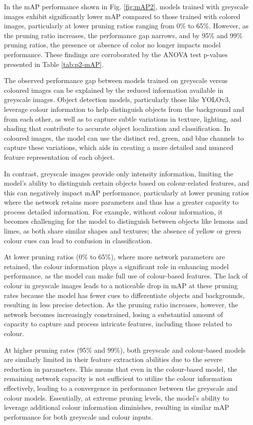 \documentclass[journal,onecolumn,12pt]{IEEEtran}
\begin{document}
In the mAP performance shown in Fig. \ref{fig:mAP2}, models trained with greyscale images exhibit significantly lower mAP compared to those trained with colored images, particularly at lower pruning ratios ranging from 0\% to 65\%. However, as the pruning ratio increases, the performance gap narrows, and by 95\% and 99\% pruning ratios, the presence or absence of color no longer impacts model performance. These findings are corroborated by the ANOVA test p-values presented in Table \ref{tab:p2-mAP}.

The observed performance gap between models trained on greyscale versus coloured images can be explained by the reduced information available in greyscale images. Object detection models, particularly those like YOLOv3, leverage colour information to help distinguish objects from the background and from each other, as well as to capture subtle variations in texture, lighting, and shading that contribute to accurate object localization and classification. In coloured images, the model can use the distinct red, green, and blue channels to capture these variations, which aids in creating a more detailed and nuanced feature representation of each object. 

In contrast, greyscale images provide only intensity information, limiting the model's ability to distinguish certain objects based on colour-related features, and this can negatively impact mAP performance, particularly at lower pruning ratios where the network retains more parameters and thus has a greater capacity to process detailed information. For example, without colour information, it becomes challenging for the model to distinguish between objects like lemons and limes, as both share similar shapes and textures; the absence of yellow or green colour cues can lead to confusion in classification.

At lower pruning ratios (0\% to 65\%), where more network parameters are retained, the colour information plays a significant role in enhancing model performance, as the model can make full use of colour-based features. The lack of colour in greyscale images leads to a noticeable drop in mAP at these pruning rates because the model has fewer cues to differentiate objects and backgrounds, resulting in less precise detection. As the pruning ratio increases, however, the network becomes increasingly constrained, losing a substantial amount of capacity to capture and process intricate features, including those related to colour. 

At higher pruning rates (95\% and 99\%), both greyscale and colour-based models are similarly limited in their feature extraction abilities due to the severe reduction in parameters. This means that even in the colour-based model, the remaining network capacity is not sufficient to utilize the colour information effectively, leading to a convergence in performance between the greyscale and colour models. Essentially, at extreme pruning levels, the model's ability to leverage additional colour information diminishes, resulting in similar mAP performance for both greyscale and colour inputs.
\end{document}
